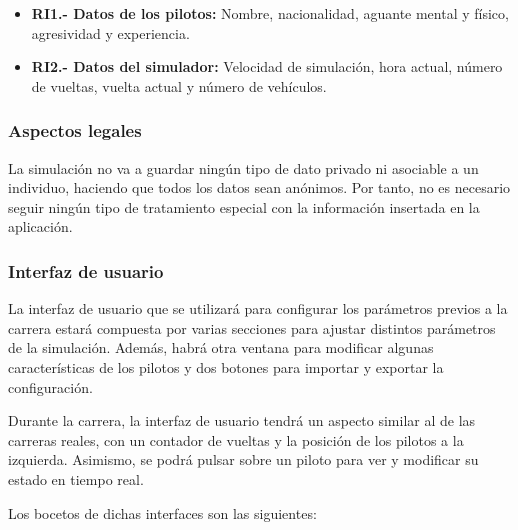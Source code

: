 \begin{itemize}
    \item \textbf{RI1.- Datos de los pilotos:} Nombre, nacionalidad, aguante mental y físico, agresividad y experiencia.
    \item \textbf{RI2.- Datos del simulador:} Velocidad de simulación, hora actual, número de vueltas, vuelta actual y número de vehículos.
\end{itemize}

\subsubsection{Aspectos legales}

La simulación no va a guardar ningún tipo de dato privado ni asociable a un individuo, haciendo que todos los datos sean anónimos. Por tanto, no es necesario seguir ningún tipo de tratamiento especial con la información insertada en la aplicación.

\subsubsection{Interfaz de usuario}

La interfaz de usuario que se utilizará para configurar los parámetros previos a la carrera estará compuesta por varias secciones para ajustar distintos parámetros de la simulación. Además, habrá otra ventana para modificar algunas características de los pilotos y dos botones para importar y exportar la configuración.

\bigskip

Durante la carrera, la interfaz de usuario tendrá un aspecto similar al de las carreras reales, con un contador de vueltas y la posición de los pilotos a la izquierda. Asimismo, se podrá pulsar sobre un piloto para ver y modificar su estado en tiempo real.

\newpage

Los bocetos de dichas interfaces son las siguientes:

